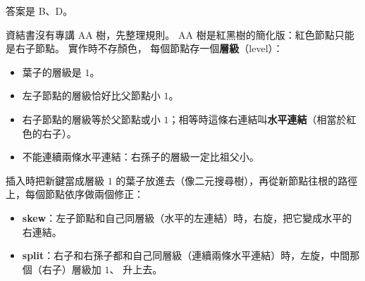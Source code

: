 \begin{pastsoln}
答案是 B、D。

資結書沒有專講 AA 樹，先整理規則。 AA 樹是紅黑樹的簡化版：紅色節點只能是右子節點。 實作時不存顏色，
每個節點存一個\textbf{層級}（level）：
\begin{itemize}
\item 葉子的層級是 $1$。
\item 左子節點的層級恰好比父節點小 $1$。
\item 右子節點的層級等於父節點或小 $1$；相等時這條右連結叫\textbf{水平連結}（相當於紅色的右子）。
\item 不能連續兩條水平連結：右孫子的層級一定比祖父小。
\end{itemize}
插入時把新鍵當成層級 $1$ 的葉子放進去（像二元搜尋樹），再從新節點往根的路徑上，每個節點依序做兩個修正：
\begin{itemize}
\item \textbf{skew}：左子節點和自己同層級（水平的左連結）時，右旋，把它變成水平的右連結。
\item \textbf{split}：右子和右孫子都和自己同層級（連續兩條水平連結）時，左旋，中間那個（右子）層級加 $1$、
升上去。
\end{itemize}


\end{pastsoln}
